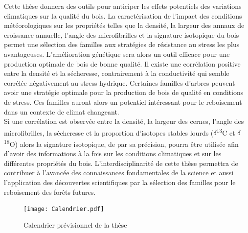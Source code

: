 \documentclass[a4paper,12pt]{report}
\newcommand{\Ctreize}{$\delta$\textsuperscript{13}C\xspace}
\newcommand{\Odixhuit}{$\delta$\textsuperscript{18}O\xspace}
\begin{document}
Cette thèse donnera des outils pour anticiper les effets potentiels des variations climatiques sur la qualité du bois. La caractérisation de l'impact des conditions météorologiques sur les propriétés telles que la densité, la largeur des annaux de croissance annuelle, l'angle des microfibrilles et la signature isotopique du bois permet une sélection des familles aux stratégies de résistance au stress les plus avantageuses. L'amélioration génétique sera alors un outil efficace pour une production optimale de bois de bonne qualité. Il existe une corrélation positive entre la densité et la sécheresse, contrairement à la conductivité qui semble corrélée négativement au stress hydrique. Certaines familles d'arbres peuvent avoir une stratégie optimale pour la production de bois de qualité en conditions de stress. Ces familles auront alors un potentiel intéressant pour le reboisement dans un contexte de climat changeant. \\

Si une corrélation est observée entre la densité, la largeur des cernes, l'angle des microfibrilles, la sécheresse et la proportion d'isotopes stables lourds (\Ctreize et \Odixhuit) alors la signature isotopique, de par sa précision, pourra être utilisée afin d'avoir des informations à la fois sur les conditions climatiques et sur les différentes propriétés du bois. L'interdisciplinarité de cette thèse permettra de contribuer à l'avancée des connaissances fondamentales de la science et aussi l'application des découvertes scientifiques par la sélection des familles pour le reboisement des forêts futures. \\

\clearpage
	
\begin{figure}
	\texttt{[image: Calendrier.pdf]}
	\caption{Calendrier prévisionnel de la thèse}
	\label{fig:calendrier}
	\end{figure}




\end{document}
